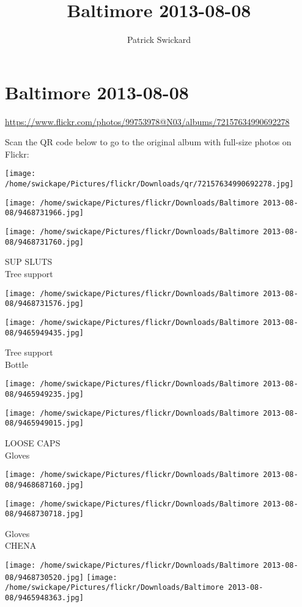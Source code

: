 \documentclass[10pt,letterpaper]{article}
\title{Baltimore 2013-08-08}
\author{Patrick Swickard}
\date{}
\begin{document}
\section*{Baltimore 2013-08-08}

\url{https://www.flickr.com/photos/99753978@N03/albums/72157634990692278}

Scan the QR code below to go to the original album with full-size photos on Flickr:

\texttt{[image: /home/swickape/Pictures/flickr/Downloads/qr/72157634990692278.jpg]}
\pagebreak

\texttt{[image: /home/swickape/Pictures/flickr/Downloads/Baltimore 2013-08-08/9468731966.jpg]}

\vspace{0.25in}
\texttt{[image: /home/swickape/Pictures/flickr/Downloads/Baltimore 2013-08-08/9468731760.jpg]}

SUP SLUTS\\
Tree support
\pagebreak

\texttt{[image: /home/swickape/Pictures/flickr/Downloads/Baltimore 2013-08-08/9468731576.jpg]}

\vspace{0.25in}
\texttt{[image: /home/swickape/Pictures/flickr/Downloads/Baltimore 2013-08-08/9465949435.jpg]}

Tree support\\
Bottle
\pagebreak

\texttt{[image: /home/swickape/Pictures/flickr/Downloads/Baltimore 2013-08-08/9465949235.jpg]}

\vspace{0.25in}
\texttt{[image: /home/swickape/Pictures/flickr/Downloads/Baltimore 2013-08-08/9465949015.jpg]}

LOOSE CAPS\\
Gloves
\pagebreak

\texttt{[image: /home/swickape/Pictures/flickr/Downloads/Baltimore 2013-08-08/9468687160.jpg]}

\vspace{0.25in}
\texttt{[image: /home/swickape/Pictures/flickr/Downloads/Baltimore 2013-08-08/9468730718.jpg]}

Gloves\\
CHENA
\pagebreak

\texttt{[image: /home/swickape/Pictures/flickr/Downloads/Baltimore 2013-08-08/9468730520.jpg]}
\texttt{[image: /home/swickape/Pictures/flickr/Downloads/Baltimore 2013-08-08/9465948363.jpg]}
\end{document}
